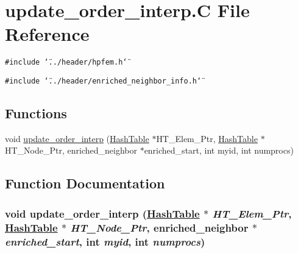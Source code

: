 \hypertarget{update__order__interp_8C}{
\section{update\_\-order\_\-interp.C File Reference}
\label{update__order__interp_8C}
}
{\tt \#include \char`\"{}../header/hpfem.h\char`\"{}}\par
{\tt \#include \char`\"{}../header/enriched\_\-neighbor\_\-info.h\char`\"{}}\par
\subsection*{Functions}
\begin{CompactItemize}
\item 
void \hyperlink{update__order__interp_8C_a0}{update\_\-order\_\-interp} (\hyperlink{classHashTable}{Hash\-Table} $\ast$HT\_\-Elem\_\-Ptr, \hyperlink{classHashTable}{Hash\-Table} $\ast$HT\_\-Node\_\-Ptr, enriched\_\-neighbor $\ast$enriched\_\-start, int myid, int numprocs)
\end{CompactItemize}


\subsection{Function Documentation}
\hypertarget{update__order__interp_8C_a0}{
\subsubsection[update\_\-order\_\-interp]{\setlength{\rightskip}{0pt plus 5cm}void update\_\-order\_\-interp (\hyperlink{classHashTable}{Hash\-Table} $\ast$ {\em HT\_\-Elem\_\-Ptr}, \hyperlink{classHashTable}{Hash\-Table} $\ast$ {\em HT\_\-Node\_\-Ptr}, enriched\_\-neighbor $\ast$ {\em enriched\_\-start}, int {\em myid}, int {\em numprocs})}}
\label{update__order__interp_8C_a0}


